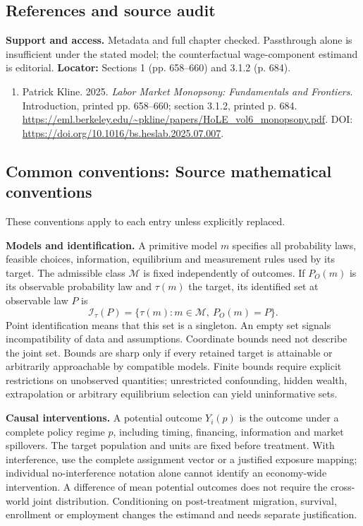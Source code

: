 \documentclass[11pt,a4paper]{article}
\begin{document}
\subsection*{References and source audit}
\textbf{Support and access.} Metadata and full chapter checked. Passthrough alone is insufficient under the stated model; the counterfactual wage-component estimand is editorial. \textbf{Locator:} Sections 1 (pp. 658--660) and 3.1.2 (p. 684).
\begin{enumerate}\raggedright
\item\hypertarget{definitions:source:30007632:1}{} Patrick Kline. 2025. \emph{Labor Market Monopsony: Fundamentals and Frontiers}. Introduction, printed pp. 658–660; section 3.1.2, printed p. 684.
\url{https://eml.berkeley.edu/~pkline/papers/HoLE_vol6_monopsony.pdf}.
DOI: \url{https://doi.org/10.1016/bs.heslab.2025.07.007}.
\end{enumerate}

\subsection*{Common conventions: Source mathematical conventions}

These conventions apply to each entry unless explicitly replaced.

\textbf{Models and identification.} A primitive model \(m\) specifies all probability laws, feasible choices, information, equilibrium and measurement rules used by its target. The admissible class \(\mathcal M\) is fixed independently of outcomes. If \(P_O(m)\) is its observable probability law and \(\tau(m)\) the target, its identified set at observable law \(P\) is
\[
 \mathcal I_\tau(P)=\{\tau(m):m\in\mathcal M,\ P_O(m)=P\}.
\]
Point identification means that this set is a singleton. An empty set signals incompatibility of data and assumptions. Coordinate bounds need not describe the joint set. Bounds are sharp only if every retained target is attainable or arbitrarily approachable by compatible models. Finite bounds require explicit restrictions on unobserved quantities; unrestricted confounding, hidden wealth, extrapolation or arbitrary equilibrium selection can yield uninformative sets.

\textbf{Causal interventions.} A potential outcome \(Y_i(p)\) is the outcome under a complete policy regime \(p\), including timing, financing, information and market spillovers. The target population and units are fixed before treatment. With interference, use the complete assignment vector or a justified exposure mapping; individual no-interference notation alone cannot identify an economy-wide intervention. A difference of mean potential outcomes does not require the cross-world joint distribution. Conditioning on post-treatment migration, survival, enrollment or employment changes the estimand and needs separate justification.
\end{document}
